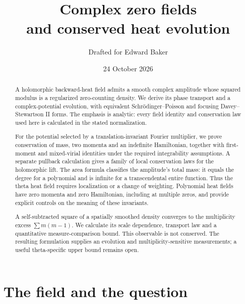\documentclass[11pt]{article}
\title{Complex zero fields\\and conserved heat evolution}
\author{Drafted for Edward Baker}
\date{24 October 2026}
\theoremstyle{definition}
\theoremstyle{remark}
\begin{document}
\maketitle

\begin{abstract}
A holomorphic backward-heat field admits a smooth complex amplitude
whose squared modulus is a regularized zero-counting density. We derive
its phase transport and a complex-potential evolution, with equivalent
Schr\"odinger--Poisson and focusing Davey--Stewartson II forms.
The emphasis is analytic: every field identity and conservation law used
here is calculated in the stated normalization.

For the potential selected by a translation-invariant Fourier multiplier,
we prove conservation of mass, two momenta and an indefinite Hamiltonian,
together with first-moment and mixed-virial identities under the required
integrability assumptions. A separate pullback calculation gives a family
of local conservation laws for the holomorphic lift. The area formula
classifies the amplitude's total mass: it equals the degree for a
polynomial and is infinite for a transcendental entire function. Thus
the theta heat field requires localization or a change of weighting.
Polynomial heat fields have zero momenta and zero Hamiltonian, including
at multiple zeros, and provide explicit controls on the meaning of these
invariants.

A self-subtracted square of a spatially smoothed density converges to
the multiplicity excess $\sum m(m-1)$. We calculate its scale dependence,
transport law and a quantitative measure-comparison bound. This
observable is not conserved. The resulting formulation supplies an
evolution and multiplicity-sensitive measurements; a useful
theta-specific upper bound remains open.
\end{abstract}

\clearpage
\tableofcontents
\clearpage

\section{The field and the question}
\label{sec:setup}
\end{document}
